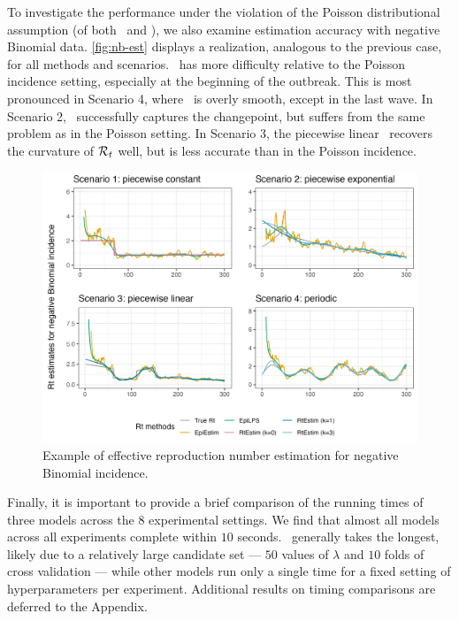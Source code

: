 To investigate the performance under the violation of the Poisson distributional
assumption (of both \RtEstim\ and \EpiEstim), we also examine estimation
accuracy with negative Binomial data. \autoref{fig:nb-est} displays a
realization, analogous to the previous case, for all methods and scenarios.
\RtEstim\ has more difficulty relative to the Poisson incidence setting,
especially at the beginning of the outbreak. This is most pronounced in Scenario
4, where \RtEstim\ is overly smooth, except in the last wave. In Scenario 2,
\RtEstim\ successfully captures the changepoint, but suffers from the same
problem as in the Poisson setting. In Scenario 3, the piecewise linear \RtEstim\
recovers the curvature of $\mathcal{R}_t$ well, but is less accurate than
in the Poisson incidence.

\begin{figure}[tb]
    \centering
    \includegraphics*[width=.99\textwidth]{fig/NB-res-plot.png}
    \caption{Example of effective reproduction number estimation for negative Binomial
    incidence.}
    \label{fig:nb-est}
\end{figure}

Finally, it is important to provide a brief comparison of the running times of
three models across the $8$ experimental settings. We find that almost all
models across all experiments complete within $10$ seconds.
\RtEstim\ generally takes the longest, likely due to a relatively large
candidate set --- $50$ values of $\lambda$ and $10$ folds of cross validation --- while
other models run only a single time for a fixed setting of hyperparameters per
experiment. Additional results on timing comparisons are deferred to the
Appendix. 


